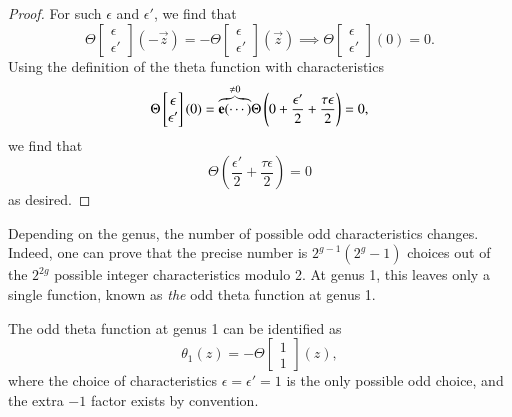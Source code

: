 \begin{proof}
    For such $\epsilon$ and $\epsilon'$, we find that
    \begin{equation}
        \Theta\begin{bmatrix}\epsilon \\ \epsilon'\end{bmatrix}(-\vec z) = -\Theta\begin{bmatrix}\epsilon \\ \epsilon'\end{bmatrix}(\vec z) \implies \Theta\begin{bmatrix}\epsilon \\ \epsilon'\end{bmatrix}(0) = 0.
    \end{equation}
    Using the definition of the theta function with characteristics
    \begin{equation}
        \Theta\begin{bmatrix}\epsilon \\ \epsilon'\end{bmatrix}(0) = \overset{\neq 0}{\overbrace{\mathbf{e}( \cdots )}}\Theta\left(0+ \frac{\epsilon'}{2}+\frac{\tau\epsilon}{2}\right) = 0,
    \end{equation}
    we find that
    \begin{equation}
        \Theta\left(\frac{\epsilon'}{2}+\frac{\tau\epsilon}{2}\right) = 0
    \end{equation}
    as desired.
\end{proof}

Depending on the genus, the number of possible odd characteristics changes. Indeed, one can prove that the precise number is $2^{g-1}(2^g-1)$ choices out of the $2^{2g}$ possible integer characteristics modulo 2. At genus 1, this leaves only a single function, known as \emph{the} odd theta function at genus 1.

\begin{definition}
    The odd theta function at genus 1 can be identified as
    \begin{equation}
        \theta_1(z) = -\Theta \begin{bmatrix}1 \\ 1\end{bmatrix} (z),
    \end{equation}
    where the choice of characteristics $\epsilon=\epsilon'=1$ is the only possible odd choice, and the extra $-1$ factor exists by convention.
\end{definition}

